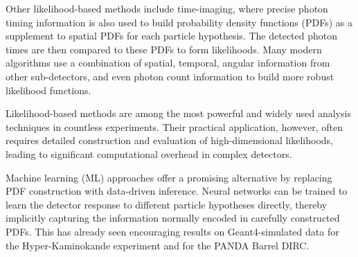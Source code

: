 Other likelihood-based methods include time-imaging, where precise photon timing information is also used to build probability density functions (PDFs) as a supplement to spatial PDFs for each particle hypothesis. \nolinebreak\cite{time-imaging-roman_2020} The detected photon times are then compared to these PDFs to form likelihoods. Many modern algorithms use a combination of spatial, temporal, angular information from other sub-detectors, and even photon count information to build more robust likelihood functions.

Likelihood-based methods are among the most powerful and widely used analysis techniques in countless experiments. Their practical application, however, often requires detailed construction and evaluation of high-dimensional likelihoods, 
leading to significant computational overhead in complex detectors.

Machine learning (ML) approaches offer a promising alternative by replacing PDF construction with data-driven inference. Neural networks can be trained to learn the detector response to different particle hypotheses directly, thereby implicitly capturing the information normally encoded in carefully constructed PDFs. This has already seen encouraging results on Geant4-simulated data for the Hyper-Kaminokande experiment \nolinebreak\cite{Prouse_2023} and for the PANDA Barrel DIRC. \nolinebreak\cite{film-networks-markhoff_2026}

